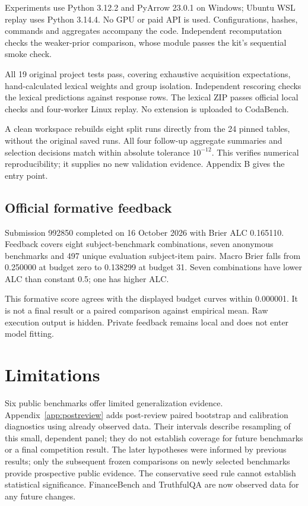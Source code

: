 \documentclass{article}
\begin{document}
Experiments use Python 3.12.2 and PyArrow 23.0.1 on Windows; Ubuntu WSL replay uses Python 3.14.4. No GPU or paid API is used. Configurations, hashes, commands and aggregates accompany the code. Independent recomputation checks the weaker-prior comparison, whose module passes the kit's sequential smoke check.

All 19 original project tests pass, covering exhaustive acquisition expectations, hand-calculated lexical weights and group isolation. Independent rescoring checks the lexical predictions against response rows. The lexical ZIP passes official local checks and four-worker Linux replay. No extension is uploaded to CodaBench.

A clean workspace rebuilds eight split runs directly from the 24 pinned tables, without the original saved runs. All four follow-up aggregate summaries and selection decisions match within absolute tolerance \(10^{-12}\). This verifies numerical reproducibility; it supplies no new validation evidence. Appendix B gives the entry point.

\subsection{Official formative feedback}\label{official-formative-feedback}

Submission 992850 completed on 16 October 2026 with Brier ALC 0.165110. Feedback covers eight subject-benchmark combinations, seven anonymous benchmarks and 497 unique evaluation subject-item pairs. Macro Brier falls from 0.250000 at budget zero to 0.138299 at budget 31. Seven combinations have lower ALC than constant 0.5; one has higher ALC.

This formative score agrees with the displayed budget curves within 0.000001. It is not a final result or a paired comparison against empirical mean. Raw execution output is hidden. Private feedback remains local and does not enter model fitting.

\section{Limitations}\label{limitations}

Six public benchmarks offer limited generalization evidence. Appendix~\ref{app:postreview} adds post-review paired bootstrap and calibration diagnostics using already observed data. Their intervals describe resampling of this small, dependent panel; they do not establish coverage for future benchmarks or a final competition result. The later hypotheses were informed by previous results; only the subsequent frozen comparisons on newly selected benchmarks provide prospective public evidence. The conservative seed rule cannot establish statistical significance. FinanceBench and TruthfulQA are now observed data for any future changes.
\end{document}
